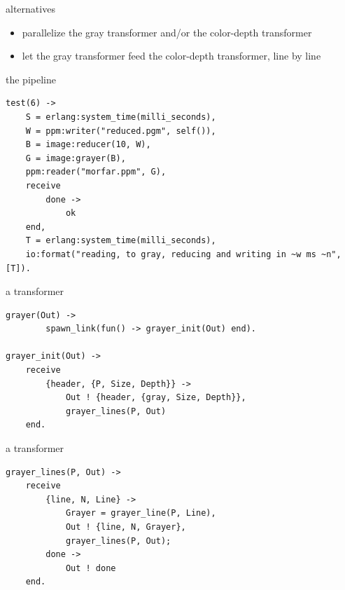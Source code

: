 \begin{frame}{alternatives}

\begin{itemize}
\pause \item parallelize the gray transformer and/or the color-depth transformer 
\pause \item let the gray transformer feed the color-depth transformer, line by line
\end{itemize}

\pause\vspace{10pt}{\em A pipe-line: reader - transform - transform - writer}

\end{frame}

\begin{frame}[fragile]{the pipeline}

\begin{verbatim}
test(6) ->
    S = erlang:system_time(milli_seconds),
    W = ppm:writer("reduced.pgm", self()),
    B = image:reducer(10, W),
    G = image:grayer(B),
    ppm:reader("morfar.ppm", G),
    receive 
        done ->
            ok
    end,
    T = erlang:system_time(milli_seconds),
    io:format("reading, to gray, reducing and writing in ~w ms ~n", [T]).
\end{verbatim}

\end{frame}

\begin{frame}[fragile]{a transformer}
\begin{verbatim}
grayer(Out) ->
        spawn_link(fun() -> grayer_init(Out) end).

grayer_init(Out) ->
    receive 
        {header, {P, Size, Depth}} ->
            Out ! {header, {gray, Size, Depth}},
            grayer_lines(P, Out)
    end.
\end{verbatim}
\end{frame}


\begin{frame}[fragile]{a transformer}
\begin{verbatim}
grayer_lines(P, Out) ->
    receive
        {line, N, Line} ->
            Grayer = grayer_line(P, Line),
            Out ! {line, N, Grayer},
            grayer_lines(P, Out);
        done ->
            Out ! done
    end.
\end{verbatim}
\end{frame}

